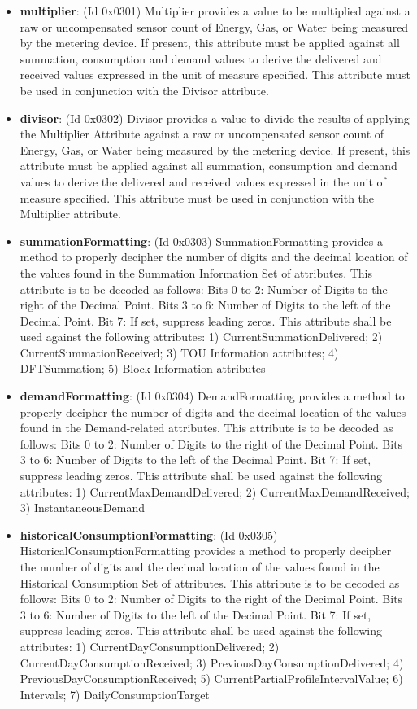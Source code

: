 \begin{itemize}
\item \textbf{multiplier}: (Id 0x0301) Multiplier provides a value to be multiplied against a raw or uncompensated sensor count of Energy, Gas, or Water being measured by the metering device. If present, this attribute must be applied against all summation, consumption and demand values to derive the delivered and received values expressed in the unit of measure specified. This attribute must be used in conjunction with the Divisor attribute.
\item \textbf{divisor}: (Id 0x0302) Divisor provides a value to divide the results of applying the Multiplier Attribute against a raw or uncompensated sensor count of Energy, Gas, or Water being measured by the metering device. If present, this attribute must be applied against all summation, consumption and demand values to derive the delivered and received values expressed in the unit of measure specified. This attribute must be used in conjunction with the Multiplier attribute.
\item \textbf{summationFormatting}: (Id 0x0303) SummationFormatting provides a method to properly decipher the number of digits and the decimal location of the values found in the Summation Information Set of attributes. This attribute is to be decoded as follows: Bits 0 to 2: Number of Digits to the right of the Decimal Point. Bits 3 to 6: Number of Digits to the left of the Decimal Point. Bit 7: If set, suppress leading zeros. This attribute shall be used against the following attributes: 1) CurrentSummationDelivered; 2) CurrentSummationReceived; 3) TOU Information attributes; 4) DFTSummation; 5) Block Information attributes
\item \textbf{demandFormatting}: (Id 0x0304) DemandFormatting provides a method to properly decipher the number of digits and the decimal location of the values found in the Demand-related attributes. This attribute is to be decoded as follows: Bits 0 to 2: Number of Digits to the right of the Decimal Point. Bits 3 to 6: Number of Digits to the left of the Decimal Point. Bit 7: If set, suppress leading zeros. This attribute shall be used against the following attributes: 1) CurrentMaxDemandDelivered; 2) CurrentMaxDemandReceived; 3) InstantaneousDemand
\item \textbf{historicalConsumptionFormatting}: (Id 0x0305) HistoricalConsumptionFormatting provides a method to properly decipher the number of digits and the decimal location of the values found in the Historical Consumption Set of attributes. This attribute is to be decoded as follows: Bits 0 to 2: Number of Digits to the right of the Decimal Point. Bits 3 to 6: Number of Digits to the left of the Decimal Point. Bit 7: If set, suppress leading zeros. This attribute shall be used against the following attributes: 1) CurrentDayConsumptionDelivered; 2) CurrentDayConsumptionReceived; 3) PreviousDayConsumptionDelivered; 4) PreviousDayConsumptionReceived; 5) CurrentPartialProfileIntervalValue; 6) Intervals; 7) DailyConsumptionTarget

\end{itemize}
